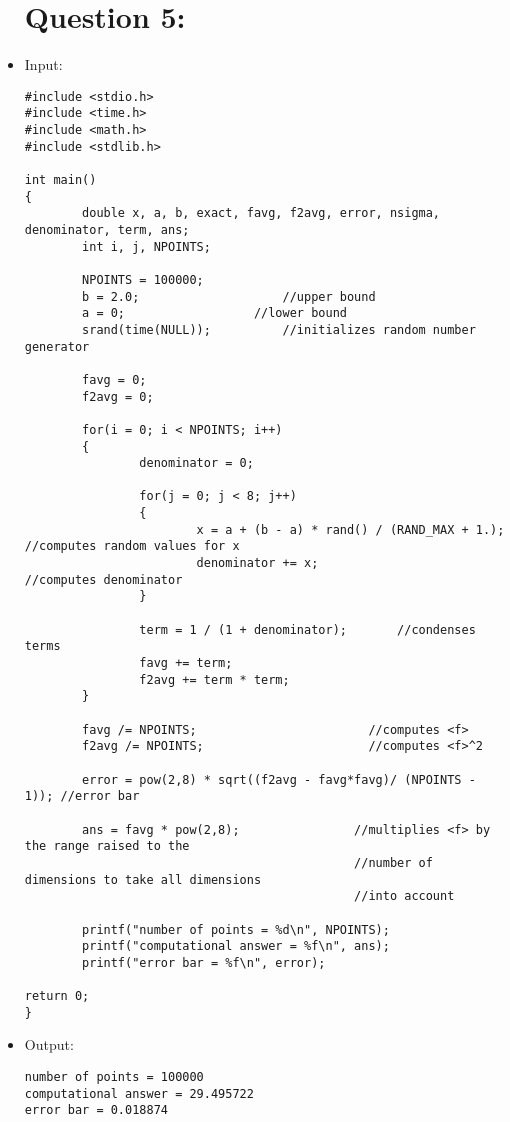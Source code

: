 \documentclass[10pt]{article}
\begin{document}
\begin{itemize}
\section*{Question 5:}
\item Input:
\begin{verbatim}
#include <stdio.h>
#include <time.h>
#include <math.h>
#include <stdlib.h>

int main()
{
        double x, a, b, exact, favg, f2avg, error, nsigma, denominator, term, ans;
        int i, j, NPOINTS;
        
        NPOINTS = 100000;
        b = 2.0;					//upper bound
        a = 0;					//lower bound
        srand(time(NULL));			//initializes random number generator 
        
        favg = 0;
        f2avg = 0;
        
        for(i = 0; i < NPOINTS; i++)
        {
                denominator = 0;
                
                for(j = 0; j < 8; j++)
                {		
                        x = a + (b - a) * rand() / (RAND_MAX + 1.);	//computes random values for x
                        denominator += x;                               //computes denominator
                }
                
                term = 1 / (1 + denominator);		//condenses terms
                favg += term;
                f2avg += term * term;		
        }

        favg /= NPOINTS;	                    //computes <f>						
        f2avg /= NPOINTS;				        //computes <f>^2	
        
        error = pow(2,8) * sqrt((f2avg - favg*favg)/ (NPOINTS - 1)); //error bar
        
        ans = favg * pow(2,8);                //multiplies <f> by the range raised to the 
                                              //number of dimensions to take all dimensions 
                                              //into account

        printf("number of points = %d\n", NPOINTS);
        printf("computational answer = %f\n", ans);
        printf("error bar = %f\n", error);

return 0;
}
\end{verbatim}
\item Output:
\begin{verbatim}
number of points = 100000
computational answer = 29.495722
error bar = 0.018874
\end{verbatim}
\end{itemize}
\end{document}
